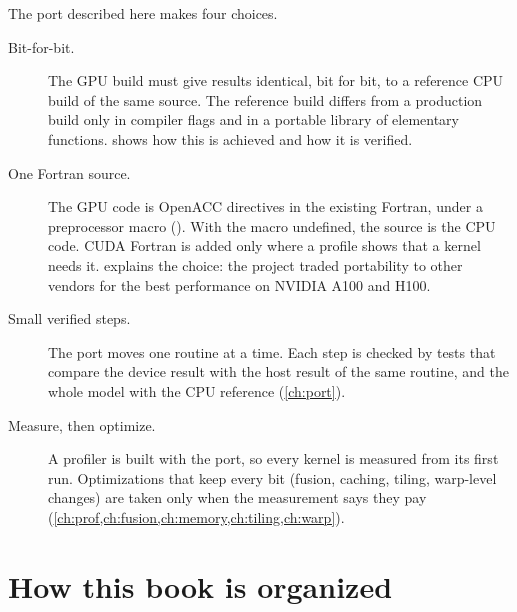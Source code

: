 The port described here makes four choices.
\begin{description}
  \item[Bit-for-bit.] The GPU build must give results identical, bit for bit, to a reference CPU build of the same
    source. The reference build differs from a production build only in compiler flags and in a portable library of
    elementary functions.  shows how this is achieved and how it is verified.
  \item[One Fortran source.] The GPU code is OpenACC directives in the existing Fortran, under a preprocessor macro
    (). With the macro undefined, the source is the CPU code. CUDA Fortran is added only where a
    profile shows that a kernel needs it.  explains the choice: the project traded portability to other
    vendors for the best performance on NVIDIA A100 and H100.
  \item[Small verified steps.] The port moves one routine at a time. Each step is checked by tests that compare the
    device result with the host result of the same routine, and the whole model with the CPU reference
    (\cref{ch:port}).
  \item[Measure, then optimize.] A profiler is built with the port, so every kernel is measured from its first run.
    Optimizations that keep every bit (fusion, caching, tiling, warp-level changes) are taken only when the
    measurement says they pay (\cref{ch:prof,ch:fusion,ch:memory,ch:tiling,ch:warp}).
\end{description}

\section{How this book is organized}

